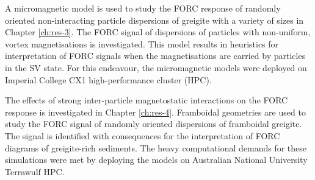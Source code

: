 A micromagnetic model is used to study the FORC response of randomly oriented non-interacting particle dispersions of greigite with a variety of sizes in Chapter \ref{ch:res-3}. The FORC signal of dispersions of particles with non-uniform, vortex magnetisations is investigated. This model results in heuristics for interpretation of FORC signals when the magnetisations are carried by particles in the SV state. For this endeavour, the micromagnetic models were deployed on Imperial College CX1 high-performance cluster (HPC).\par

The effects of strong inter-particle magnetostatic interactions on the FORC response is investigated in Chapter \ref{ch:res-4}. Framboidal geometries are used to study the FORC signal of randomly oriented dispersions of framboidal greigite. The signal is identified with consequences for the interpretation of FORC diagrams of greigite-rich sediments. The heavy computational demands for these simulations were met by deploying the models on Australian National University Terrawulf HPC.\par

%
%

